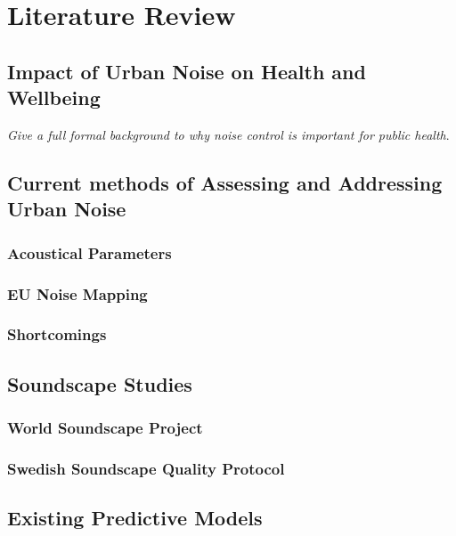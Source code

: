 \chapter{Literature Review}
\label{ch:lit}

\section{Impact of Urban Noise on Health and Wellbeing}

  \emph{Give a full formal background to why noise control is important for public health}.

\section{Current methods of Assessing and Addressing Urban Noise}

  \subsection{Acoustical Parameters}

  \subsection{EU Noise Mapping}

  \subsection{Shortcomings}

\section{Soundscape Studies}

  \subsection{World Soundscape Project}

  \subsection{Swedish Soundscape Quality Protocol}

\section{Existing Predictive Models}

  \cite{Lionello2020}


